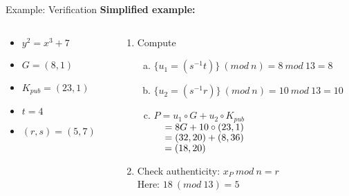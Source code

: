 \documentclass[]{beamer}
\begin{document}
\begin{frame}{Example: Verification}
	\textbf{Simplified example:}\\
	\begin{columns}[T]
		\begin{column}{0.3\textwidth}
				\begin{itemize}
					\item $y^2 = x^3 + 7$
					\item $G = (8, 1)$
					\item $K_{pub} = (23, 1)$
					\item $t = 4$
					\item $(r, s) = (5, 7)$
				\end{itemize}
		\end{column}
		\begin{column}{0.7\textwidth}
			\begin{enumerate}
				\item<2-> Compute\\
				\begin{enumerate}[a.]
					\item<2-> $\{u_1 = (s^{-1}t)\}\ (mod\ n) = 8\ mod\ 13 = 8$\\
					\vspace{0.5em}
					\item<3-> $\{u_2 = (s^{-1}r)\}\ (mod\ n) = 10\ mod\ 13 = 10$\\
					\vspace{0.5em}
					\item<4-> $P = u_1 \circ G + u_2 \circ K_{pub}$\\
					 $\hphantom{P }  = 8G + 10 \circ (23, 1)$\\
					 $\hphantom{P } = (32, 20) + (8, 36)$\\
					 $\hphantom{P } = (18, 20)$
				\end{enumerate}
				\item<5-> Check authenticity: $x_P\ mod\ n = r$\\
				Here: $18\ (mod\ 13) = 5$
			\end{enumerate}
		\end{column}
	\end{columns}
	\vspace{1.5em}
\end{frame}


%	
%	
\end{document}

